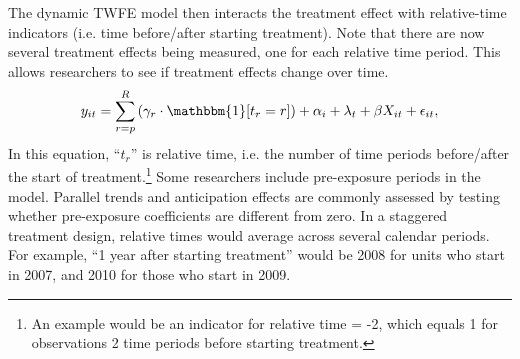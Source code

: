 \documentclass[12pt]{article}
\begin{document}
The dynamic TWFE model then interacts the treatment effect with relative-time indicators (i.e. time before/after starting treatment). Note that there are now several treatment effects being measured, one for each relative time period. This allows researchers to see if treatment effects change over time.
\begin{equation}
    y_{it} = \sum_{r=p}^R\left(\gamma_r\cdot\mathbbm{1}[t_r=r]\right) + \alpha_i + \lambda_t + \beta X_{it} + \epsilon_{it},    
\end{equation}
In this equation, “$t_r$” is relative time, i.e. the number of time periods before/after the start of treatment.\footnote{An example would be an indicator for relative time = -2, which equals 1 for observations 2 time periods before starting treatment.} Some researchers include pre-exposure periods in the model.  Parallel trends and anticipation effects are commonly assessed by testing whether pre-exposure coefficients are different from zero. In a staggered treatment design, relative times would average across several calendar periods. For example, “1 year after starting treatment” would be 2008 for units who start in 2007, and 2010 for those who start in 2009.
\end{document}
